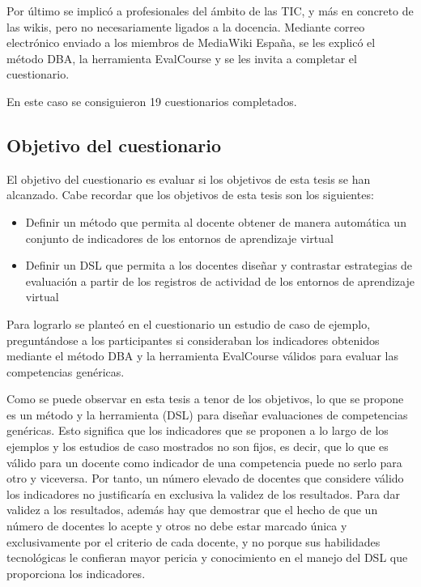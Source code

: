 	Por último se implicó a profesionales del ámbito de las TIC, y más en concreto de las wikis, pero no necesariamente ligados a la docencia. Mediante correo electrónico enviado a los miembros de MediaWiki España, se les explicó el método DBA, la herramienta EvalCourse y se les invita a completar el cuestionario.		

En este caso se consiguieron 19 cuestionarios completados.

\subsection{Objetivo del cuestionario}

El objetivo del cuestionario es evaluar si los objetivos de esta tesis se han alcanzado. Cabe recordar que los objetivos de esta tesis son los siguientes:

\begin{itemize}
\item Definir un método que permita al docente obtener de manera automática un conjunto de indicadores de los entornos de aprendizaje virtual
\item Definir un DSL que permita a los docentes diseñar y contrastar estrategias de evaluación a partir de los registros de actividad de los entornos de aprendizaje virtual
\end{itemize}

Para lograrlo se planteó en el cuestionario un estudio de caso de ejemplo, preguntándose a los participantes si consideraban los indicadores obtenidos mediante el método DBA y la herramienta EvalCourse válidos para evaluar las competencias genéricas.%

Como se puede observar en esta tesis a tenor de los objetivos, lo que se propone es un método y la herramienta (DSL) para diseñar evaluaciones de competencias genéricas. Esto significa que los indicadores que se proponen a lo largo de los ejemplos y los estudios de caso mostrados no son fijos, es decir, que lo que es válido para un docente como indicador de una competencia puede no serlo para otro y viceversa. Por tanto, un número elevado de docentes que considere válido los indicadores no justificaría en exclusiva la validez de los resultados. Para dar validez a los resultados, además hay que demostrar que el hecho de que un número de docentes lo acepte y otros no debe estar marcado única y exclusivamente por el criterio de cada docente, y no porque sus habilidades tecnológicas le confieran mayor pericia y conocimiento en el manejo del DSL que proporciona los indicadores.


